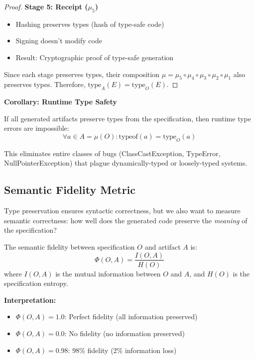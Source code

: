 \begin{proof}
    \textbf{Stage 5: Receipt (\(\mu_5\))}
    \begin{itemize}
        \item Hashing preserves types (hash of type-safe code)
        \item Signing doesn't modify code
        \item Result: Cryptographic proof of type-safe generation
    \end{itemize}

    Since each stage preserves types, their composition \(\mu = \mu_5 \circ \mu_4 \circ \mu_3 \circ \mu_2 \circ \mu_1\) also preserves types. Therefore, \(\text{type}_A(E) = \text{type}_O(E)\).
\end{proof}

\textbf{Corollary: Runtime Type Safety}

If all generated artifacts preserve types from the specification, then runtime type errors are impossible:
\begin{equation}
    \forall a \in A = \mu(O): \text{typeof}(a) = \text{type}_O(a)
\end{equation}

This eliminates entire classes of bugs (ClassCastException, TypeError, NullPointerException) that plague dynamically-typed or loosely-typed systems.

\subsection{Semantic Fidelity Metric}

Type preservation ensures syntactic correctness, but we also want to measure semantic correctness: how well does the generated code preserve the \textit{meaning} of the specification?

\begin{definition}
    The semantic fidelity between specification \(O\) and artifact \(A\) is:
    \begin{equation}
        \Phi(O,A) = \frac{I(O,A)}{H(O)}
    \end{equation}
    where \(I(O,A)\) is the mutual information between \(O\) and \(A\), and \(H(O)\) is the specification entropy.
\end{definition}

\textbf{Interpretation:}
\begin{itemize}
    \item \(\Phi(O,A) = 1.0\): Perfect fidelity (all information preserved)
    \item \(\Phi(O,A) = 0.0\): No fidelity (no information preserved)
    \item \(\Phi(O,A) = 0.98\): 98\% fidelity (2\% information loss)
\end{itemize}

